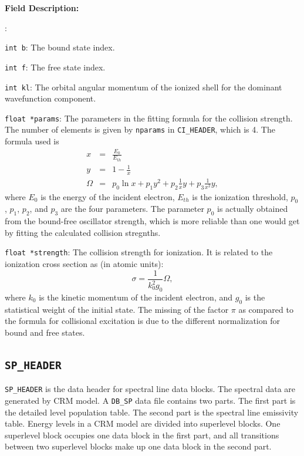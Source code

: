 \documentclass[twoside,letterpaper]{refrep}
\newenvironment{dbdesc}{\textbf{Field Description:} \begin{list}
	{:}{\setlength{\labelwidth}{2in}
	   \setlength{\leftmargin}{2in}
	   \setlength{\labelsep}{0.1in}
	   \setlength{\rightmargin}{0.2in}}}
	{\end{list}}
\begin{document}
\begin{dbdesc}
\item[\texttt{int b}:] The bound state index.
\item[\texttt{int f}:] The free state index.
\item[\texttt{int kl}:] The orbital angular momentum of the ionized shell for
the dominant wavefunction component.
\item[\texttt{float *params}:] The parameters in the fitting formula for the
collision strength. The number of elements is given by \texttt{nparams} in
\texttt{CI\_HEADER}, which is 4. The formula used is
\begin{eqnarray}
x &=& \frac{E_0}{E_{th}} \nonumber\\
y &=& 1-\frac{1}{x} \nonumber\\
\Omega &=& p_0\ln x + p_1y^2 + p_2\frac{1}{x}y + p_3\frac{1}{x^2}y,
\end{eqnarray}
where $E_0$ is the energy of the incident electron, $E_{th}$ is the ionization
threshold, $p_0$, $p_1$, $p_2$, and $p_3$ are the four parameters. The
parameter $p_0$ is actually obtained from the bound-free oscillator strength,
which is more reliable than one would get by fitting the calculated collision stregnths.
\item[\texttt{float *strength}:] The collision strength for ionization. It is
related to the ionization cross section as (in atomic units):
\begin{equation}
\sigma = \frac{1}{k_0^2g_0}\Omega,
\end{equation}
where ${k_0}$ is the kinetic momentum of the incident electron, and $g_0$ is
the statistical weight of the initial state. The missing of the factor $\pi$
as compared to the formula for collisional excitation is due to the different
normalization for bound and free states.
\end{dbdesc}

\subsection{\texttt{SP\_HEADER}}
\label{subsec:sp_header}
\texttt{SP\_HEADER} is the data header for spectral line data blocks. The
spectral data are generated by CRM model. A \texttt{DB\_SP} data file contains
two parts. The first part is the detailed level population table. The second
part is the spectral line emissivity table. Energy levels in a CRM model are
divided into superlevel blocks. One superlevel block occupies one data
block in the first part, and all transitions between two superlevel blocks
make up one data block in the second part.
\end{document}
